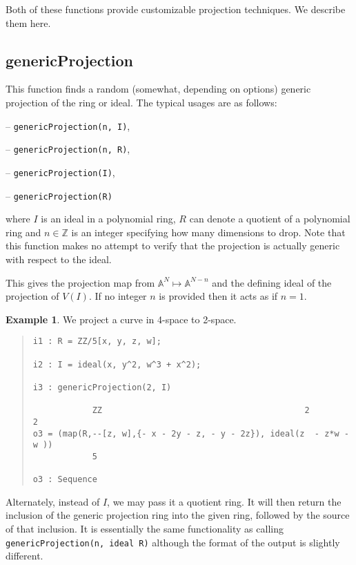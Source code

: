\documentclass[11pt]{amsart}
\theoremstyle{definition}
\newtheorem{example}{Example}[section]
\begin{document}
Both of these functions provide customizable projection techniques. We describe them here. 


\subsection{genericProjection} 
This function finds a random (somewhat, depending on options) generic projection of the ring or ideal.
The typical usages are as follows: 
\vspace{0.5em}

-- {\tt genericProjection(n, I)},

-- {\tt genericProjection(n, R)},


-- {\tt genericProjection(I)},  

-- {\tt genericProjection(R)} 

\vspace{0.5em}
\noindent where 
$I$ is an ideal 
in a polynomial ring, 
$R$ can denote a quotient of a polynomial ring and 
$n\in \mathbb{Z}$ is
an integer specifying how many dimensions to drop.  Note that this function makes no attempt to verify that the projection is actually generic with respect to the ideal.


This gives the projection map from $\mathbb{A}^N \mapsto\mathbb{A}^{N-n}$ and the defining ideal of the projection of $V(I)$. If no integer $n$ is provided then it acts as if $n = 1$. 


\begin{example}	
    We project a curve in 4-space to 2-space.
    ~~
  {{\small\color{blue}
  \begin{quote}
\begin{verbatim}
i1 : R = ZZ/5[x, y, z, w];

i2 : I = ideal(x, y^2, w^3 + x^2);

i3 : genericProjection(2, I)

            ZZ                                         2          2
o3 = (map(R,--[z, w],{- x - 2y - z, - y - 2z}), ideal(z  - z*w - w ))                   
            5

o3 : Sequence
\end{verbatim}
\end{quote}
    }}
\end{example}

Alternately, instead of {$I$}, we may pass it a quotient ring.  It will then return the inclusion of the generic projection ring into the given ring, followed by the source of that inclusion.  It is essentially the same functionality as calling {\tt genericProjection(n, ideal R)} although the format of the output is slightly different. 
\end{document}
